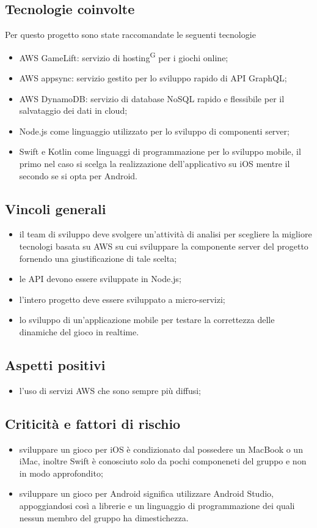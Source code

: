   \subsection{Tecnologie coinvolte}
Per questo progetto sono state raccomandate le seguenti tecnologie
\begin{itemize}
    \item AWS GameLift: servizio di hosting\textsuperscript{G} per i giochi online;
    \item AWS appsync: servizio gestito per lo sviluppo rapido di API GraphQL;
    \item AWS DynamoDB: servizio di database NoSQL rapido e flessibile per il salvataggio dei dati in cloud;
    \item Node.js come linguaggio utilizzato per lo sviluppo di componenti server;
    \item Swift e Kotlin come linguaggi di programmazione per lo sviluppo mobile, il primo nel caso si scelga la realizzazione dell'applicativo su iOS mentre il secondo se si opta per Android.
\end{itemize}

  \subsection{Vincoli generali}
\begin{itemize}
    \item il team di sviluppo deve svolgere un'attività di analisi per scegliere la migliore tecnologi basata su AWS su cui sviluppare la componente server del progetto fornendo una giustificazione di tale scelta;
    \item le API devono essere sviluppate in Node.js;
    \item l'intero progetto deve essere sviluppato a micro-servizi;
    \item lo sviluppo di un'applicazione mobile per testare la correttezza delle dinamiche del gioco in realtime.
\end{itemize}

  \subsection{Aspetti positivi}
\begin{itemize}
    \item l'uso di servizi AWS che sono sempre più diffusi;
\end{itemize}

  \subsection{Criticità e fattori di rischio}
\begin{itemize}
    \item sviluppare un gioco per iOS è condizionato dal possedere un MacBook o un iMac, inoltre Swift è conosciuto solo da pochi componeneti del gruppo e non in modo approfondito;
    \item sviluppare un gioco per Android significa utilizzare Android Studio, appoggiandosi così a librerie e un linguaggio di programmazione dei quali nessun membro del gruppo ha dimestichezza.
\end{itemize}

